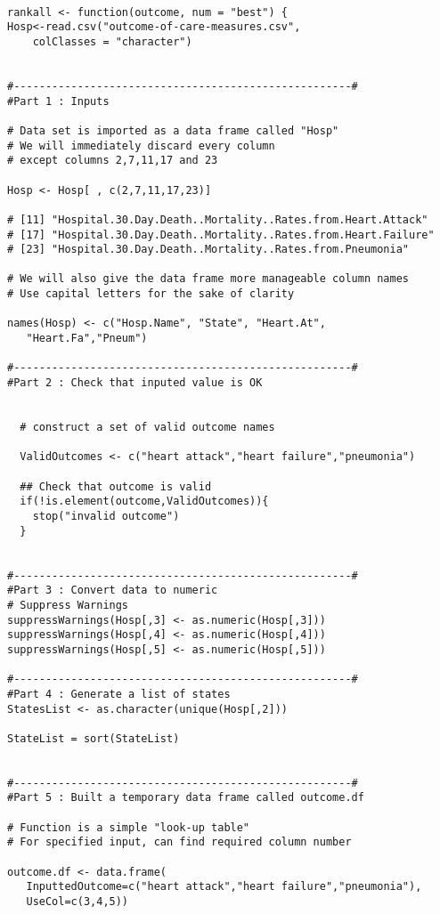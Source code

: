 \documentclass[]{article}
\begin{document}
\begin{framed}
\begin{verbatim}

rankall <- function(outcome, num = "best") {
Hosp<-read.csv("outcome-of-care-measures.csv",
    colClasses = "character")


#-----------------------------------------------------#
#Part 1 : Inputs

# Data set is imported as a data frame called "Hosp"
# We will immediately discard every column 
# except columns 2,7,11,17 and 23

Hosp <- Hosp[ , c(2,7,11,17,23)]

# [11] "Hospital.30.Day.Death..Mortality..Rates.from.Heart.Attack"                            
# [17] "Hospital.30.Day.Death..Mortality..Rates.from.Heart.Failure"                           
# [23] "Hospital.30.Day.Death..Mortality..Rates.from.Pneumonia"        

# We will also give the data frame more manageable column names
# Use capital letters for the sake of clarity

names(Hosp) <- c("Hosp.Name", "State", "Heart.At",
   "Heart.Fa","Pneum")

#-----------------------------------------------------#
#Part 2 : Check that inputed value is OK


  # construct a set of valid outcome names

  ValidOutcomes <- c("heart attack","heart failure","pneumonia")

  ## Check that outcome is valid
  if(!is.element(outcome,ValidOutcomes)){
    stop("invalid outcome")
  }


#-----------------------------------------------------#
#Part 3 : Convert data to numeric
# Suppress Warnings
suppressWarnings(Hosp[,3] <- as.numeric(Hosp[,3]))
suppressWarnings(Hosp[,4] <- as.numeric(Hosp[,4]))
suppressWarnings(Hosp[,5] <- as.numeric(Hosp[,5]))

#-----------------------------------------------------#
#Part 4 : Generate a list of states
StatesList <- as.character(unique(Hosp[,2]))

StateList = sort(StateList)


#-----------------------------------------------------#
#Part 5 : Built a temporary data frame called outcome.df

# Function is a simple "look-up table"
# For specified input, can find required column number

outcome.df <- data.frame(
   InputtedOutcome=c("heart attack","heart failure","pneumonia"),
   UseCol=c(3,4,5))



\end{verbatim}
\end{framed}
\end{document}
